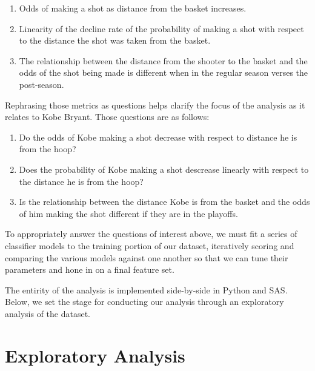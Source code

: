 \begin{enumerate}
    \item Odds of making a shot as distance from the basket increases.

    \item Linearity of the decline rate of the probability of making a shot with respect to the distance the shot was taken from the basket.

    \item The relationship between the distance from the shooter to the basket and the odds of the shot being made is different when in the regular season verses the post-season.
\end{enumerate}

Rephrasing those metrics as questions helps clarify the focus of the analysis as it relates to Kobe Bryant. Those questions are as follows:

\begin{enumerate}
    \item Do the odds of Kobe making a shot decrease with respect to distance he is from the hoop?

    \item Does the probability of Kobe making a shot descrease linearly with respect to the distance he is from the hoop?

    \item Is the relationship between the distance Kobe is from the basket and the odds of him making the shot different if they are in the playoffs.
\end{enumerate}

\par
To appropriately answer the questions of interest above, we must fit a series of classifier models to the training portion of our dataset, iteratively scoring and comparing the various models against one another so that we can tune their parameters and hone in on a final feature set.\par
The entirity of the analysis is implemented side-by-side in Python and SAS.
Below, we set the stage for conducting our analysis through an exploratory analysis of the dataset.\par


\section{Exploratory Analysis}

